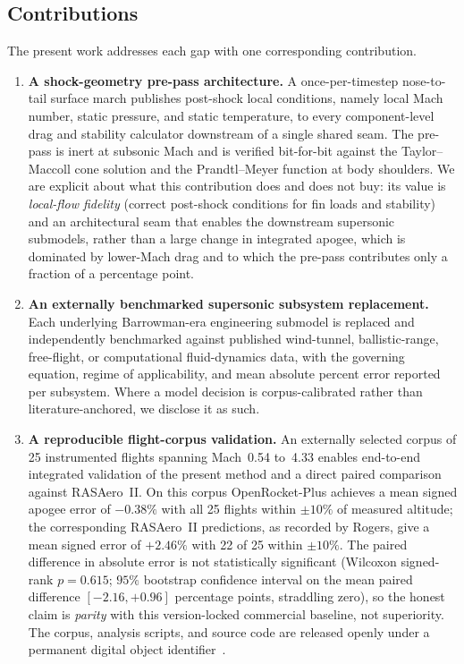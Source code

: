 \subsection{Contributions}

The present work addresses each gap with one corresponding contribution.

\begin{enumerate}
  \item \textbf{A shock-geometry pre-pass architecture.} A once-per-timestep
  nose-to-tail surface march publishes post-shock local conditions, namely local
  Mach number, static pressure, and static temperature, to every component-level
  drag and stability calculator downstream of a single shared seam. The pre-pass
  is inert at subsonic Mach and is verified bit-for-bit against the
  Taylor--Maccoll cone solution and the Prandtl--Meyer function at body
  shoulders. We are explicit about what this contribution does and does not buy:
  its value is \textit{local-flow fidelity} (correct post-shock conditions for
  fin loads and stability) and an architectural seam that enables the downstream
  supersonic submodels, rather than a large change in integrated apogee, which is
  dominated by lower-Mach drag and to which the pre-pass contributes only a
  fraction of a percentage point.

  \item \textbf{An externally benchmarked supersonic subsystem replacement.}
  Each underlying Barrowman-era engineering submodel is replaced and
  independently benchmarked against published wind-tunnel, ballistic-range,
  free-flight, or computational fluid-dynamics data, with the governing
  equation, regime of applicability, and mean absolute percent error reported
  per subsystem. Where a model decision is corpus-calibrated rather than
  literature-anchored, we disclose it as such.

  \item \textbf{A reproducible flight-corpus validation.} An externally selected
  corpus of 25 instrumented flights spanning Mach~0.54 to~4.33 enables
  end-to-end integrated validation of the present method and a direct paired
  comparison against RASAero~II. On this corpus OpenRocket-Plus achieves a mean
  signed apogee error of $-0.38\%$ with all 25 flights within $\pm10\%$ of
  measured altitude; the corresponding RASAero~II predictions, as recorded by
  Rogers, give a mean signed error of $+2.46\%$ with 22 of 25 within $\pm10\%$.
  The paired difference in absolute error is not statistically significant
  (Wilcoxon signed-rank $p=0.615$; $95\%$ bootstrap confidence interval on the
  mean paired difference $[-2.16, +0.96]$ percentage points, straddling zero), so
  the honest claim is \emph{parity} with this version-locked commercial baseline,
  not superiority. The corpus, analysis scripts, and source code are released
  openly under a permanent digital object identifier~\cite{rfd_zenodo}.
\end{enumerate}


